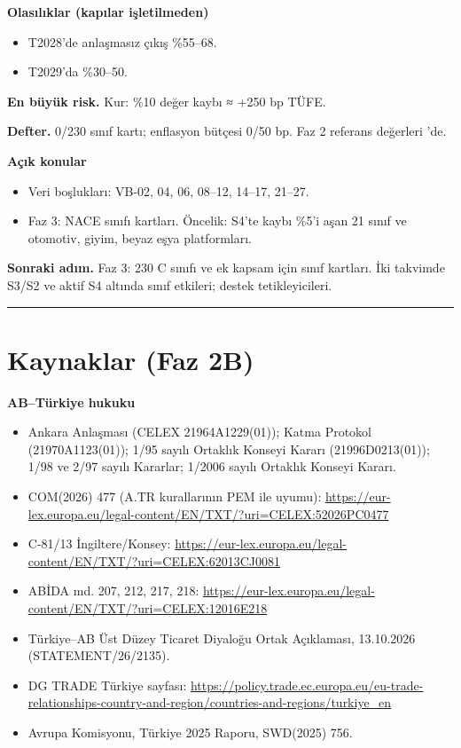 \textbf{Olasılıklar (kapılar işletilmeden)}

\begin{itemize}
\tightlist
\item
  T2028'de anlaşmasız çıkış \%55--68.
\item
  T2029'da \%30--50.
\end{itemize}

\textbf{En büyük risk.} Kur: \%10 değer kaybı ≈ +250 bp TÜFE.

\textbf{Defter.} 0/230 sınıf kartı; enflasyon bütçesi 0/50 bp. Faz 2 referans değerleri 'de.

\textbf{Açık konular}

\begin{itemize}
\tightlist
\item
  Veri boşlukları: VB-02, 04, 06, 08--12, 14--17, 21--27.
\item
  Faz 3: NACE sınıfı kartları. Öncelik: S4'te kaybı \%5'i aşan 21 sınıf ve otomotiv, giyim, beyaz eşya platformları.
\end{itemize}

\textbf{Sonraki adım.} Faz 3: 230 C sınıfı ve ek kapsam için sınıf kartları. İki takvimde S3/S2 ve aktif S4 altında sınıf etkileri; destek tetikleyicileri.

\begin{center}\rule{0.5\linewidth}{0.5pt}\end{center}

\hypertarget{02b_secenekler_hukuk-kaynaklar-faz-2b}{%
\section{Kaynaklar (Faz 2B)}\label{02b_secenekler_hukuk-kaynaklar-faz-2b}}

\textbf{AB--Türkiye hukuku}

\begin{itemize}
\tightlist
\item
  Ankara Anlaşması (CELEX 21964A1229(01)); Katma Protokol (21970A1123(01)); 1/95 sayılı Ortaklık Konseyi Kararı (21996D0213(01)); 1/98 ve 2/97 sayılı Kararlar; 1/2006 sayılı Ortaklık Konseyi Kararı.
\item
  COM(2026) 477 (A.TR kurallarının PEM ile uyumu): \url{https://eur-lex.europa.eu/legal-content/EN/TXT/?uri=CELEX:52026PC0477}
\item
  C-81/13 İngiltere/Konsey: \url{https://eur-lex.europa.eu/legal-content/EN/TXT/?uri=CELEX:62013CJ0081}
\item
  ABİDA md. 207, 212, 217, 218: \url{https://eur-lex.europa.eu/legal-content/EN/TXT/?uri=CELEX:12016E218}
\item
  Türkiye--AB Üst Düzey Ticaret Diyaloğu Ortak Açıklaması, 13.10.2026 (STATEMENT/26/2135).
\item
  DG TRADE Türkiye sayfası: \url{https://policy.trade.ec.europa.eu/eu-trade-relationships-country-and-region/countries-and-regions/turkiye_en}
\item
  Avrupa Komisyonu, Türkiye 2025 Raporu, SWD(2025) 756.
\end{itemize}

